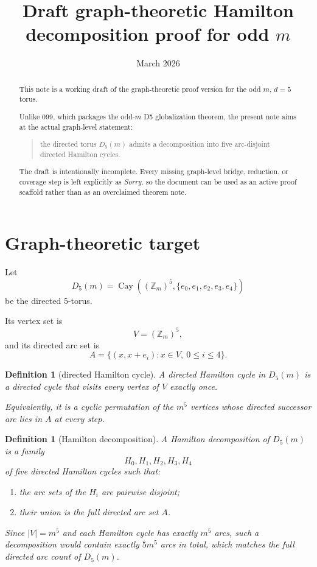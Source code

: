 \documentclass[11pt]{article}
\title{Draft graph-theoretic Hamilton decomposition proof for odd $m$}
\author{}
\date{March 2026}
\newtheorem{definition}[theorem]{Definition}
\newcommand{\Z}{\mathbb Z}
\begin{document}
\maketitle

\begin{abstract}
This note is a working draft of the graph-theoretic proof version for the odd
$m$, $d=5$ torus.

Unlike 099, which packages the odd-$m$ D5 globalization theorem, the present
note aims at the actual graph-level statement:
\begin{quote}
the directed torus $D_5(m)$ admits a decomposition into five arc-disjoint
directed Hamilton cycles.
\end{quote}

The draft is intentionally incomplete. Every missing graph-level bridge,
reduction, or coverage step is left explicitly as \emph{Sorry.} so the document
can be used as an active proof scaffold rather than as an overclaimed theorem
note.
\end{abstract}

\section{Graph-theoretic target}

Let
\[
D_5(m)=\operatorname{Cay}((\Z_m)^5,\{e_0,e_1,e_2,e_3,e_4\})
\]
be the directed $5$-torus.

Its vertex set is
\[
V=(\Z_m)^5,
\]
and its directed arc set is
\[
A=\{(x,x+e_i): x\in V,\ 0\le i\le 4\}.
\]

\begin{definition}[directed Hamilton cycle]
A \emph{directed Hamilton cycle} in $D_5(m)$ is a directed cycle that visits
every vertex of $V$ exactly once.

Equivalently, it is a cyclic permutation of the $m^5$ vertices whose directed
successor arc lies in $A$ at every step.
\end{definition}

\begin{definition}[Hamilton decomposition]
A \emph{Hamilton decomposition} of $D_5(m)$ is a family
\[
H_0,H_1,H_2,H_3,H_4
\]
of five directed Hamilton cycles such that:
\begin{enumerate}[label=\textup{(\arabic*)},leftmargin=2.5em]
\item the arc sets of the $H_i$ are pairwise disjoint;
\item their union is the full directed arc set $A$.
\end{enumerate}

Since $|V|=m^5$ and each Hamilton cycle has exactly $m^5$ arcs, such a
decomposition would contain exactly $5m^5$ arcs in total, which matches the
full directed arc count of $D_5(m)$.
\end{definition}
\end{document}
